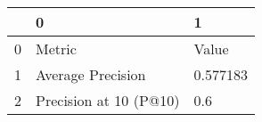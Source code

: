 \begin{tabular}{lll}
\toprule
{} &                       0 &         1 \\
\midrule
0 &                  Metric &     Value \\
1 &       Average Precision &  0.577183 \\
2 &  Precision at 10 (P@10) &       0.6 \\
\bottomrule
\end{tabular}
